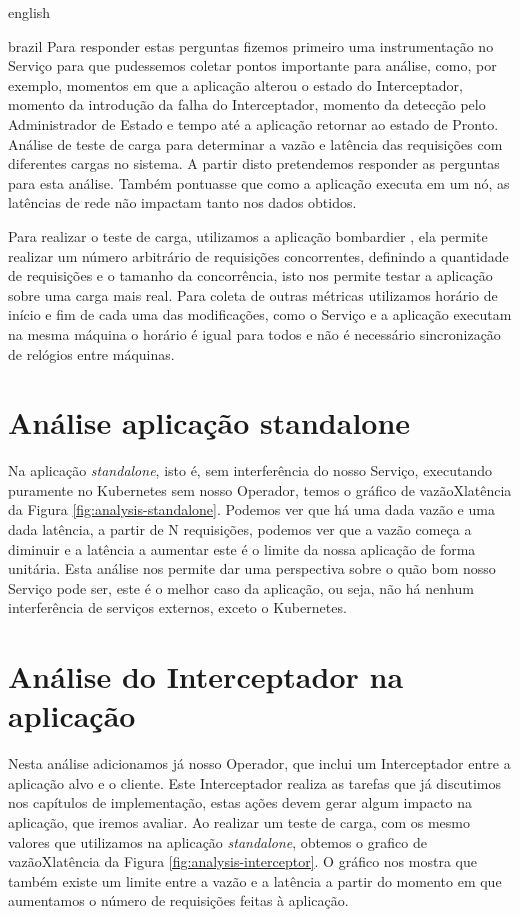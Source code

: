 \begin{otherlanguage*}{english}
\begin{otherlanguage*}{brazil}
Para responder estas perguntas fizemos primeiro uma instrumentação no Serviço para que
pudessemos coletar pontos importante para análise, como, por exemplo, momentos em que a
aplicação alterou o estado do Interceptador, momento da introdução da falha do Interceptador,
momento da detecção pelo Administrador de Estado e tempo até a aplicação retornar ao estado
de Pronto. Análise de teste de carga para determinar a vazão e latência das requisições com
diferentes cargas no sistema. A partir disto pretendemos responder as perguntas para esta
análise. Também pontuasse que como a aplicação executa em um nó, as latências de rede não
impactam tanto nos dados obtidos.

Para realizar o teste de carga, utilizamos a aplicação bombardier \cite{bombardier}, ela
permite realizar um número arbitrário de requisições concorrentes, definindo a quantidade
de requisições e o tamanho da concorrência, isto nos permite testar a aplicação sobre uma
carga mais real. Para coleta de outras métricas utilizamos horário de início e fim de cada
uma das modificações, como o Serviço e a aplicação executam na mesma máquina o horário é
igual para todos e não é necessário sincronização de relógios entre máquinas.

\section{Análise aplicação standalone}

Na aplicação \textit{standalone}, isto é, sem interferência do nosso Serviço, executando
puramente no Kubernetes sem nosso Operador, temos o gráfico de vazãoXlatência da Figura
\ref{fig:analysis-standalone}. Podemos ver que há uma dada vazão e uma dada latência,
a partir de N requisições, podemos ver que a vazão começa a diminuir e a latência a aumentar
este é o limite da nossa aplicação de forma unitária. Esta análise nos permite dar uma
perspectiva sobre o quão bom nosso Serviço pode ser, este é o melhor caso da aplicação,
ou seja, não há nenhum interferência de serviços externos, exceto o Kubernetes. 


\section{Análise do Interceptador na aplicação}

Nesta análise adicionamos já nosso Operador, que inclui um Interceptador entre a aplicação
alvo e o cliente. Este Interceptador realiza as tarefas que já discutimos nos capítulos de 
implementação, estas ações devem gerar algum impacto na aplicação, que iremos avaliar. Ao
realizar um teste de carga, com os mesmo valores que utilizamos na aplicação
\textit{standalone}, obtemos o grafico de vazãoXlatência da Figura
\ref{fig:analysis-interceptor}. O gráfico nos mostra que também existe um limite entre 
a vazão e a latência a partir do momento em que aumentamos o número de requisições feitas
à aplicação.


\end{otherlanguage*}
\end{otherlanguage*}

